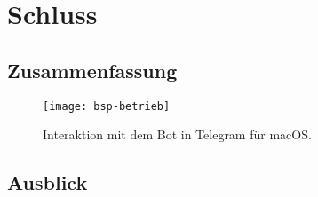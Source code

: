 \chapter{Schluss}

\section{Zusammenfassung}

\begin{figure}[h!]
\centering
\texttt{[image: bsp-betrieb]}
\caption{Interaktion mit dem Bot in Telegram für macOS.}
\end{figure}

\section{Ausblick}

